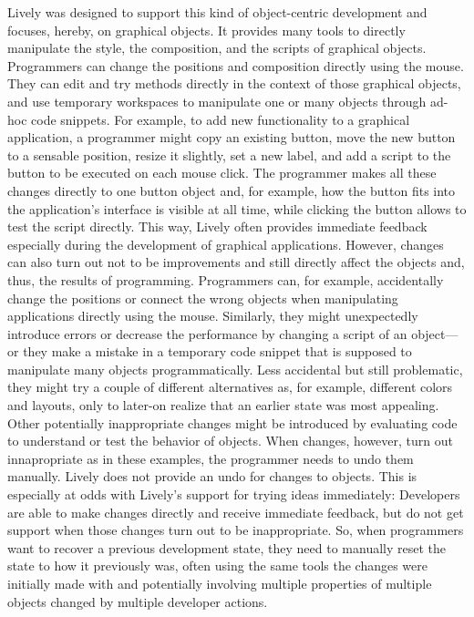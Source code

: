 Lively was designed to support this kind of object-centric development and focuses, hereby, on graphical objects.
It provides many tools to directly manipulate the style, the composition, and the scripts of graphical objects.
Programmers can change the positions and composition directly using the mouse.
They can edit and try methods directly in the context of those graphical objects, and use temporary workspaces to manipulate one or many objects through ad-hoc code snippets.
For example, to add new functionality to a graphical application, a programmer might copy an existing button, move the new button to a sensable position, resize it slightly, set a new label, and add a script to the button to be executed on each mouse click.
The programmer makes all these changes directly to one button object and, for example, how the button fits into the application's interface is visible at all time, while clicking the button allows to test the script directly.
This way, Lively often provides immediate feedback especially during the development of graphical applications.
However, changes can also turn out not to be improvements and still directly affect the objects and, thus, the results of programming.
Programmers can, for example, accidentally change the positions or connect the wrong objects when manipulating applications directly using the mouse.
Similarly, they might unexpectedly introduce errors or decrease the performance by changing a script of an object---or they make a mistake in a temporary code snippet that is supposed to manipulate many objects programmatically.
Less accidental but still problematic, they might try a couple of different alternatives as, for example, different colors and layouts, only to later-on realize that an earlier state was most appealing.
Other potentially inappropriate changes might be introduced by evaluating code to understand or test the behavior of objects.
When changes, however, turn out innapropriate as in these examples, the programmer needs to undo them manually.
Lively does not provide an undo for changes to objects. %
This is especially at odds with Lively's support for trying ideas immediately: Developers are able to make changes directly and receive immediate feedback, but do not get support when those changes turn out to be inappropriate.
So, when programmers want to recover a previous development state, they need to manually reset the state to how it previously was, often using the same tools the changes were initially made with and potentially involving multiple properties of multiple objects changed by multiple developer actions.

